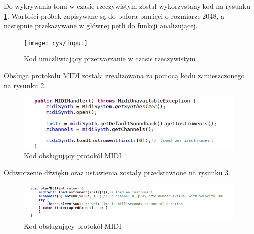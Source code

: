 Do wykrywania tonu w czasie rzeczywistym został wykorzystany kod na rysunku \ref{input}. Wartości próbek zapisywane są do bufora pamięci o rozmiarze 2048, a następnie przekazywane w głównej pętli do funkcji analizującej.
\begin{figure}[h!]
  \centering
  \texttt{[image: rys/input]}
  \caption{Kod umożliwiający przetwarzanie w czasie rzeczywistym}
  \label{input}
\end{figure}

\newpage

Obsługa protokołu MIDI została zrealizowana za pomocą kodu zamieszczonego na rysunku \ref{kodMIDI}.

\begin{figure}[h!]
  \centering
  \includegraphics[width=0.9\linewidth]{rys/kodMIDI}
  \caption{Kod obsługujący protokół MIDI}
  \label{kodMIDI}
\end{figure}
Odtworzenie dźwięku oraz ustawienia zostały przedstawione na rysunku \ref{kodMIDI2}.

\begin{figure}[h!]
  \centering
  \includegraphics[width=0.9\linewidth]{rys/kodMIDIPlay}
  \caption{Kod obsługujący protokół MIDI}
  \label{kodMIDI2}
\end{figure}
